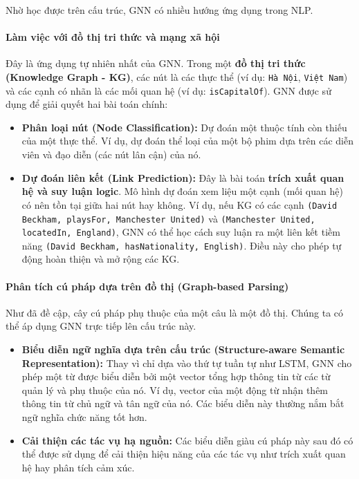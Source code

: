Nhờ học được trên cấu trúc, GNN có nhiều hướng ứng dụng trong NLP.

\paragraph{Làm việc với đồ thị tri thức và mạng xã hội}
Đây là ứng dụng tự nhiên nhất của GNN. Trong một \textbf{đồ thị tri thức (Knowledge Graph - KG)}, các nút là các thực thể (ví dụ: \texttt{Hà Nội}, \texttt{Việt Nam}) và các cạnh có nhãn là các mối quan hệ (ví dụ: \texttt{isCapitalOf}).
GNN được sử dụng để giải quyết hai bài toán chính:
\begin{itemize}
    \item \textbf{Phân loại nút (Node Classification):} Dự đoán một thuộc tính còn thiếu của một thực thể. Ví dụ, dự đoán thể loại của một bộ phim dựa trên các diễn viên và đạo diễn (các nút lân cận) của nó.
    \item \textbf{Dự đoán liên kết (Link Prediction):} Đây là bài toán \textbf{trích xuất quan hệ và suy luận logic}. Mô hình dự đoán xem liệu một cạnh (mối quan hệ) có nên tồn tại giữa hai nút hay không. Ví dụ, nếu KG có các cạnh \texttt{(David Beckham, playsFor, Manchester United)} và \texttt{(Manchester United, locatedIn, England)}, GNN có thể học cách suy luận ra một liên kết tiềm năng \texttt{(David Beckham, hasNationality, English)}. Điều này cho phép tự động hoàn thiện và mở rộng các KG.
\end{itemize}

\paragraph{Phân tích cú pháp dựa trên đồ thị (Graph-based Parsing)}
Như đã đề cập, cây cú pháp phụ thuộc của một câu là một đồ thị. Chúng ta có thể áp dụng GNN trực tiếp lên cấu trúc này.
\begin{itemize}
    \item \textbf{Biểu diễn ngữ nghĩa dựa trên cấu trúc (Structure-aware Semantic Representation):} Thay vì chỉ dựa vào thứ tự tuần tự như LSTM, GNN cho phép một từ được biểu diễn bởi một vector tổng hợp thông tin từ các từ quản lý và phụ thuộc của nó. Ví dụ, vector của một động từ nhận thêm thông tin từ chủ ngữ và tân ngữ của nó. Các biểu diễn này thường nắm bắt ngữ nghĩa chức năng tốt hơn.
    \item \textbf{Cải thiện các tác vụ hạ nguồn:} Các biểu diễn giàu cú pháp này sau đó có thể được sử dụng để cải thiện hiệu năng của các tác vụ như trích xuất quan hệ hay phân tích cảm xúc.
\end{itemize}

